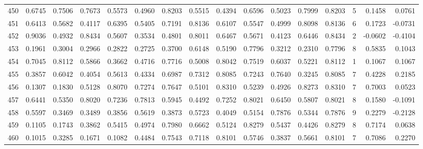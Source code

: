\begin{tabular}{lrrrrrrrrrrrrrrr}
450 &      0.6745 &  0.7506 &  0.7673 &  0.5573 &  0.4960 &  0.8203 &  0.5515 &  0.4394 &  0.6596 &  0.5023 &   0.7999 &     0.8203 &      5 &                    0.1458 &                     0.0761 \\
451 &      0.6413 &  0.5682 &  0.4117 &  0.6395 &  0.5405 &  0.7191 &  0.8136 &  0.6107 &  0.5547 &  0.4999 &   0.8098 &     0.8136 &      6 &                    0.1723 &                    -0.0731 \\
452 &      0.9036 &  0.4932 &  0.8434 &  0.5607 &  0.3534 &  0.4801 &  0.8011 &  0.6467 &  0.5671 &  0.4123 &   0.6446 &     0.8434 &      2 &                   -0.0602 &                    -0.4104 \\
453 &      0.1961 &  0.3004 &  0.2966 &  0.2822 &  0.2725 &  0.3700 &  0.6148 &  0.5190 &  0.7796 &  0.3212 &   0.2310 &     0.7796 &      8 &                    0.5835 &                     0.1043 \\
454 &      0.7045 &  0.8112 &  0.5866 &  0.3662 &  0.4716 &  0.7716 &  0.5008 &  0.8042 &  0.7519 &  0.6037 &   0.5221 &     0.8112 &      1 &                    0.1067 &                     0.1067 \\
455 &      0.3857 &  0.6042 &  0.4054 &  0.5613 &  0.4334 &  0.6987 &  0.7312 &  0.8085 &  0.7243 &  0.7640 &   0.3245 &     0.8085 &      7 &                    0.4228 &                     0.2185 \\
456 &      0.1307 &  0.1830 &  0.5128 &  0.8070 &  0.7274 &  0.7647 &  0.5101 &  0.8310 &  0.5239 &  0.4926 &   0.8273 &     0.8310 &      7 &                    0.7003 &                     0.0523 \\
457 &      0.6441 &  0.5350 &  0.8020 &  0.7236 &  0.7813 &  0.5945 &  0.4492 &  0.7252 &  0.8021 &  0.6450 &   0.5807 &     0.8021 &      8 &                    0.1580 &                    -0.1091 \\
458 &      0.5597 &  0.3469 &  0.3489 &  0.3856 &  0.5619 &  0.3873 &  0.5723 &  0.4049 &  0.5154 &  0.7876 &   0.5344 &     0.7876 &      9 &                    0.2279 &                    -0.2128 \\
459 &      0.1105 &  0.1743 &  0.3862 &  0.5415 &  0.4974 &  0.7980 &  0.6662 &  0.5124 &  0.8279 &  0.5437 &   0.4426 &     0.8279 &      8 &                    0.7174 &                     0.0638 \\
460 &      0.1015 &  0.3285 &  0.1671 &  0.1082 &  0.4484 &  0.7543 &  0.7118 &  0.8101 &  0.5746 &  0.3837 &   0.5661 &     0.8101 &      7 &                    0.7086 &                     0.2270 \\

\end{tabular}
